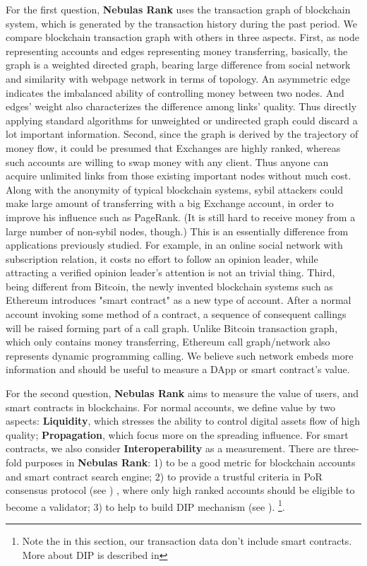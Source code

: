 For the first question, \textbf{Nebulas Rank} uses the transaction graph of blockchain system, which is generated by the transaction history during the past period. We compare blockchain transaction graph with others in three aspects. First, as node representing accounts and edges representing money transferring, basically, the graph is a weighted directed graph, bearing large difference from social network\cite{Ugander2011} and similarity with webpage network\cite{page1999pagerank} in terms of topology. An asymmetric edge indicates the imbalanced ability of controlling money between two nodes. And edges' weight also characterizes the difference among links' quality. Thus directly applying standard algorithms for unweighted or undirected graph could discard a lot important information. Second, since the graph is derived by the trajectory of money flow, it could be presumed that Exchanges are highly ranked, whereas such accounts are willing to swap money with any client. Thus anyone can acquire unlimited links from those existing important nodes without much cost. Along with the anonymity of typical blockchain systems, sybil attackers could make large amount of transferring with a big Exchange account, in order to improve his influence such as PageRank. (It is still hard to receive money from a large number of non-sybil nodes, though.) This is an essentially difference from applications previously studied. For example, in an online social network with subscription relation, it costs no effort to follow an opinion leader, while attracting a verified opinion leader's attention is not an trivial thing. Third, being different from Bitcoin\cite{Nakamoto2008}, the newly invented blockchain systems such as Ethereum\cite{Wood2014} introduces "smart contract" as a new type of account. After a normal account invoking some method of a contract, a sequence of consequent callings will be raised forming part of a call graph. Unlike Bitcoin transaction graph, which only contains money transferring, Ethereum call graph/network also represents dynamic programming calling. We believe such network embeds more information and should be useful to measure a DApp or smart contract's value.

For the second question, \textbf{Nebulas Rank} aims to measure the value of users, and smart contracts in blockchains. For normal accounts, we define value by two aspects: \textbf{Liquidity}, which stresses the ability to control digital assets flow of high quality; \textbf{Propagation}, which focus more on the spreading influence. For smart contracts, we also consider \textbf{Interoperability} as a measurement. There are three-fold purposes in \textbf{Nebulas Rank}: 1) to be a good metric for blockchain accounts and smart contract search engine; 2) to provide a trustful criteria in PoR consensus protocol (see ) , where only high ranked accounts should be eligible to become a validator; 3) to help to build DIP mechanism (see ). \footnote{Note the in this section, our transaction data don't include smart contracts. More about DIP is described in }.


